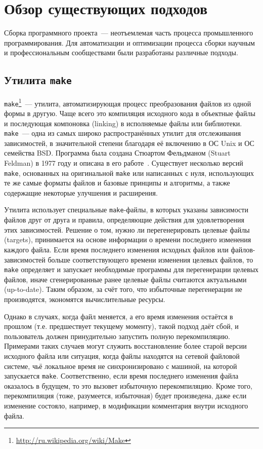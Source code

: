 \section{Обзор существующих подходов}

Сборка программного проекта~--- неотъемлемая часть процесса промышленного программирования. Для автоматизации и оптимизации процесса сборки научным и профессиональным сообществами были разработаны различные подходы.

\subsection{Утилита \texttt{make}}
\texttt{make}\footnote{\url{http://ru.wikipedia.org/wiki/Make}}~--- утилита, автоматизирующая процесс преобразования файлов из одной формы в другую. Чаще всего это компиляция исходного кода в объектные файлы и последующая компоновка (linking) в исполняемые файлы или библиотеки. \texttt{make}~--- одна из самых широко распространённых утилит для отслеживания зависимостей, в значительной степени благодаря её включению в ОС Unix и ОС семейства BSD. Программа была создана Стюартом Фельдманом (Stuart Feldman) в 1977 году и описана в его работе~\cite{feldman_make}. Существует несколько версий \texttt{make}, основанных на оригинальной \texttt{make} или написанных с нуля, использующих те же самые форматы файлов и базовые принципы и алгоритмы, а также содержащие некоторые улучшения и расширения.

Утилита использует специальные \texttt{make}-файлы, в которых указаны зависимости файлов друг от друга и правила, определяющие действия для удовлетворения этих зависимостей. Решение о том, нужно ли перегенерировать целевые файлы (targets), принимается на основе информации о времени последнего изменения каждого файла. Если время последнего изменения исходных файлов или файлов-зависимостей больше соответствующего времени изменения целевых файлов, то \texttt{make} определяет и запускает необходимые программы для перегенерации целевых файлов, иначе сгенерированные ранее целевые файлы считаются актуальными (up-to-date). Таким образом, за счёт того, что избыточные перегенерации не производятся, экономятся вычислительные ресурсы.

Однако в случаях, когда файл меняется, а его время изменения остаётся в прошлом (т.е. предшествует текущему моменту), такой подход даёт сбой, и пользователь должен принудительно запустить полную перекомпиляцию. Примерами таких случаев могут служить восстановление более старой версии исходного файла или ситуация, когда файлы находятся на сетевой файловой системе, чьё локальное время не синхронизировано с машиной, на которой запускается \texttt{make}. Соответственно, если время последнего изменения файла оказалось в будущем, то это вызовет избыточную перекомпиляцию. Кроме того, перекомпиляция (тоже, разумеется, избыточная) будет произведена, даже если изменение состояло, например, в модификации комментария внутри исходного файла.

